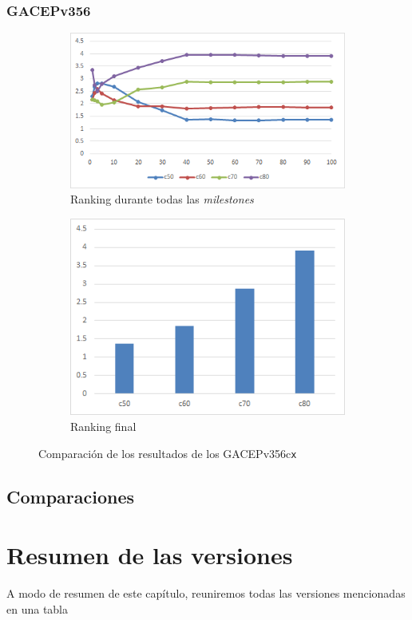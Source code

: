 \subsubsection{GACEPv356}

\begin{figure}[h]
     \centering
     \begin{subfigure}[b]{0.45\textwidth}
         \centering
         \includegraphics[width=\textwidth]{imagenes/Experimental/GACEPv356.png}
         \caption{Ranking durante todas las \textit{milestones}}
         \label{fig:GACEPv356_lineas}
     \end{subfigure}
     \hfill
     \begin{subfigure}[b]{0.45\textwidth}
         \centering
         \includegraphics[width=\textwidth]{imagenes/Experimental/barras/GACEPv356.png}
         \caption{Ranking final}
         \label{fig:GACEPv356_barras}
     \end{subfigure}
        \caption{Comparación de los resultados de los GACEPv356c\texttt{x}}
        \label{fig:GACEPv356}
\end{figure}

\subsection{Comparaciones}

\section{Resumen de las versiones}

A modo de resumen de este capítulo, reuniremos todas las versiones mencionadas en una tabla
